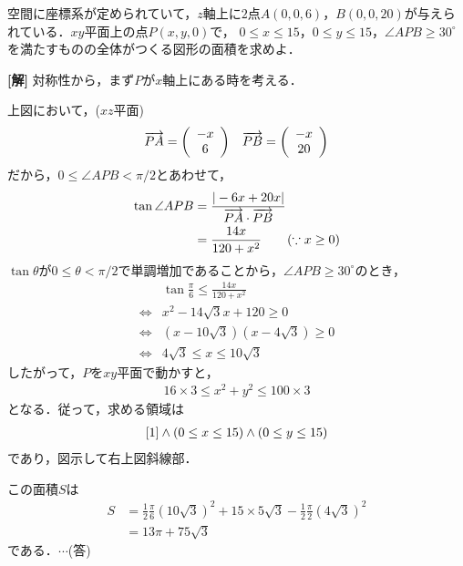 \documentclass[a4j]{jarticle}
\begin{document}

     \begin{oframed}
     空間に座標系が定められていて，$z$軸上に$2$点$A(0,0,6)$，$B(0,0,20)$が与えられている．$xy$平面上の点$P(x,y,0)$で，
     $0\le x\le15$，$0\le y\le15$，$\angle APB\ge30^\circ$を満たすものの全体がつくる図形の面積を求めよ．
     \end{oframed}

\setlength{\columnseprule}{0.4pt}
\begin{multicols}{2}
{\bf[解]} 対称性から，まず$P$が$x$軸上にある時を考える．
     \begin{center}
     \scalebox{0.8}{}
     \end{center}

上図において，($xz$平面)
     \begin{align*}
     &\overrightarrow{PA}=\left( \begin{array}{c} -x \\6 \\\end{array} \right)&\overrightarrow{PB}=\left( \begin{array}{c} -x \\20 \\\end{array} \right)
     \end{align*}
だから，$0\le\angle APB<\pi/2$とあわせて，
     \begin{align*}
     \tan\angle APB&=\frac{|-6x+20x|}{\overrightarrow{PA}\cdot\overrightarrow{PB}} \\
     &=\frac{14x}{120+x^2} \tag{$\because x\ge0$}
     \end{align*}
$\tan\theta$が$0\le\theta<\pi/2$で単調増加であることから，$\angle APB\ge30^\circ$のとき，
     \begin{align*}
     &\tan\frac{\pi}{6}\le\frac{14x}{120+x^2} \\
     \Longleftrightarrow &x^2-14\sqrt{3}x+120\ge0 \\
     \Longleftrightarrow &(x-10\sqrt{3})(x-4\sqrt{3})\ge0  \\
     \Longleftrightarrow&4\sqrt{3}\le x\le 10\sqrt{3}
     \end{align*}
したがって，$P$を$xy$平面で動かすと，
     \begin{align}
     16×3\le x^2+y^2\le100×3\label{1}
     \end{align}
となる．従って，求める領域は
      \begin{align}
      \eqref{1}\land(0\le x\le15)\land(0\le y\le15)
      \end{align}
であり，図示して右上図斜線部．
     \begin{center}
     \scalebox{0.7}{}
     \end{center}

この面積$S$は 
     \begin{align*}
     S&=\frac{1}{2}\frac{\pi}{6}(10\sqrt{3})^2+15×5\sqrt{3}-\frac{1}{2}\frac{\pi}{2}(4\sqrt{3})^2 \\
     &=13\pi+75\sqrt{3}
     \end{align*}
である．$\cdots$(答)
     

     
\newpage
\end{multicols}
\end{document}
